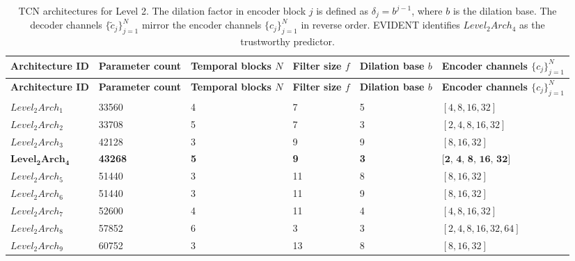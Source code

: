 \documentclass[preprint,12pt]{elsarticle}
\begin{document}
\begin{footnotesize}
\setlength{\tabcolsep}{5pt}
\renewcommand{\arraystretch}{1.3}
\begin{longtable}{p{2.2cm}p{1.8cm}p{1.6cm}p{1.4cm}p{1.6cm}p{2.0cm}}
\caption{TCN architectures for Level 2. The dilation factor in encoder block $j$ is defined as $\delta_j = b^{j-1}$, where $b$ is the dilation base. The decoder channels $\{\tilde{c}_j\}_{j=1}^{N}$ mirror the encoder channels $\{c_j\}_{j=1}^{N}$ in reverse order.
EVIDENT identifies $Level_2Arch_4$ as the trustworthy predictor.
}
\label{tab:level2}\\
\toprule
\textbf{Architecture ID} & \textbf{Parameter count} & \textbf{Temporal blocks $N$} & \textbf{Filter size $f$} & \textbf{Dilation base $b$} & \textbf{Encoder channels $\{c_j\}_{j=1}^{N}$} \\
\midrule
\endfirsthead

\toprule
\textbf{Architecture ID} & \textbf{Parameter count} & \textbf{Temporal blocks $N$} & \textbf{Filter size $f$} & \textbf{Dilation base $b$} & \textbf{Encoder channels $\{c_j\}_{j=1}^{N}$} \\
\midrule
\endhead

\endfoot

\bottomrule
\endlastfoot

$Level_2Arch_1$ & 33560 & 4 & 7  & 5 & $[4, 8, 16, 32]$        \\
$Level_2Arch_2$ & 33708 & 5 & 7  & 3 & $[2, 4, 8, 16, 32]$     \\
$Level_2Arch_3$ & 42128 & 3 & 9  & 9 & $[8, 16, 32]$           \\
$\mathbf{Level_2Arch_4}$ & \textbf{43268} & \textbf{5} & \textbf{9}  & \textbf{3} & $\textbf{[2, 4, 8, 16, 32]}$     \\
$Level_2Arch_5$ & 51440 & 3 & 11 & 8 & $[8, 16, 32]$           \\
$Level_2Arch_6$ & 51440 & 3 & 11 & 9 & $[8, 16, 32]$           \\
$Level_2Arch_7$ & 52600 & 4 & 11 & 4 & $[4, 8, 16, 32]$        \\
$Level_2Arch_8$ & 57852 & 6 & 3  & 3 & $[2, 4, 8, 16, 32, 64]$ \\
$Level_2Arch_9$ & 60752 & 3 & 13 & 8 & $[8, 16, 32]$           \\
\end{longtable}
\end{footnotesize}
\end{document}

